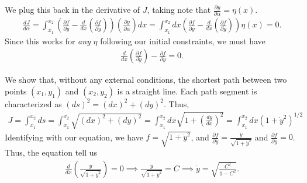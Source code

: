 We plug this back in the derivative of $J$, taking note that $\frac{\partial y}{\partial \alpha} = \eta(x)$.
\begin{align}
    \frac{dJ}{d\alpha} = \int_{x_{1}}^{x_{2}} \left( \frac{\partial f}{\partial y} - \frac{d}{dx} \left( \frac{\partial f}{\partial \dot{y}} \right) \right) \left( \frac{\partial y}{\partial \alpha} \right) dx = \int_{x_{1}}^{x_{2}} dx\left( \frac{\partial f}{\partial y} - \frac{d}{dx} \left( \frac{\partial f}{\partial \dot{y}} \right) \right) \eta(x) = 0.
\end{align}
Since this works for \textit{any} $\eta$ following our initial constraints, we must have
\begin{align}
    \frac{d}{dx} \left( \frac{\partial f}{\partial \dot{y}} \right) - \frac{\partial f}{\partial y} = 0.
\end{align}

\begin{example}
    We show that, without any external conditions, the shortest path between two points $(x_{1},y_{1})$ and $(x_{2},y_{2})$ is a straight line. Each path segment is characterized as $(ds)^{2} = (dx)^{2} + (dy)^{2}$. Thus,
    \begin{align}
        J = \int_{x_{1}}^{x_{2}} ds = \int_{x_{1}}^{x_{2}}\sqrt{(dx)^{2}+(dy)^{2}} = \int_{x_{1}}^{x_{2}} dx \sqrt{1 + \left( \frac{dy}{dx} \right)^{2}} = \int_{x_{1}}^{x_{2}} dx (1+\dot{y}^{2})^{1/2}
    \end{align}
    Identifying with our equation, we have $f = \sqrt{1+\dot{y}^{2}}$, and $\frac{\partial f}{\partial \dot{y}} = \frac{\dot{y}}{\sqrt{1+\dot{y}^{2}}}$ and $\frac{\partial f}{\partial y} = 0$. Thus, the equation tell us
    \begin{align}
        \frac{d}{dx} \left( \frac{\dot{y}}{\sqrt{1+\dot{y}^{2}}} \right) = 0 \implies \frac{\dot{y}}{\sqrt{1+\dot{y}^{2}}} = C \implies \dot{y} = \sqrt{\frac{C^{2}}{1-C^{2}}}.
    \end{align}
\end{example}


